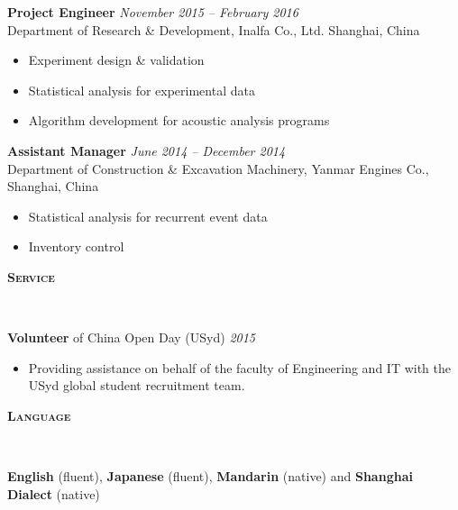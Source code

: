 \documentclass[letterpaper, 10pt]{article}
\newenvironment{changemargin}[2]{%
  \begin{list}{}{%
      \setlength{\topsep}{0pt}%
      \setlength{\leftmargin}{#1}%
      \setlength{\rightmargin}{#2}%
      \setlength{\listparindent}{\parindent}%
      \setlength{\itemindent}{\parindent}%
      \setlength{\parsep}{\parskip}%
    }%
  \item[]}{\end{list}
}
\newcommand{\lineover}{
  \begin{changemargin}{-0.05in}{-0.05in}
    \vspace*{-8pt}
    \hrulefill \\
    \vspace*{-2pt}
  \end{changemargin}
}
\newcommand{\header}[1]{
  \begin{changemargin}{-0.5in}{-0.5in}
    \textbf{\scshape{#1}}\\
    \lineover
  \end{changemargin}
}
\newenvironment{body} {
  \vspace*{-16pt}
  \begin{changemargin}{-0.25in}{-0.5in}
  }
  {\end{changemargin}
}
\begin{document}
\begin{body}
	\vspace{14pt}
	
	\textbf{Project Engineer}\hfill
	\emph{November 2015 -- February 2016} \\
	Department of Research \& Development, Inalfa Co., Ltd.  \hfill Shanghai, China
	\vspace{-2pt}
	\begin{itemize}
		\setlength{\itemindent}{0in}
		\setlength{\itemsep}{0in}
		\item Experiment design \& validation
		\item Statistical analysis for experimental data
		\item Algorithm development for acoustic analysis programs
	\end{itemize}
	
	
	\textbf{Assistant Manager}\hfill
	\emph{June 2014 -- December 2014} \\
	Department of Construction \& Excavation Machinery, Yanmar Engines Co.,  \hfill Shanghai, China
	\vspace{-2pt}
	\begin{itemize}
		\setlength{\itemindent}{0in}
		\setlength{\itemsep}{0in}
		\item Statistical analysis for recurrent event data
		\item Inventory control
	\end{itemize}
	

\end{body}
\smallskip

\header{Service}
\begin{body}
	\vspace{14pt}
	
	\textbf{Volunteer} of China Open Day (USyd) \hfill
	\emph{2015}
	\vspace{-2pt}
	\begin{itemize}
		\setlength{\itemindent}{0in}
		\setlength{\itemsep}{0in}
		\item Providing assistance on behalf of the faculty of Engineering and IT with the USyd global student recruitment team. 
	\end{itemize}
	

\end{body}
\smallskip
 \header{Language}

 \begin{body}
   \vspace{14pt}
   \textbf{English} (fluent), \textbf{Japanese} (fluent), \textbf{Mandarin} (native) and \textbf{Shanghai Dialect} (native) \\
 \end{body}
\end{document}
